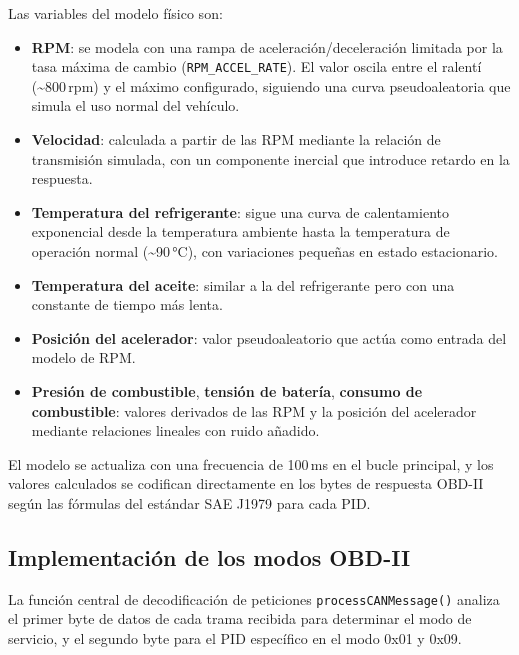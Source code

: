Las variables del modelo físico son:

\begin{itemize}
    \item \textbf{RPM}: se modela con una rampa de aceleración/deceleración limitada por la tasa máxima de cambio (\texttt{RPM\_ACCEL\_RATE}). El valor oscila entre el ralentí (\textasciitilde{}800\,rpm) y el máximo configurado, siguiendo una curva pseudoaleatoria que simula el uso normal del vehículo.

    \item \textbf{Velocidad}: calculada a partir de las RPM mediante la relación de transmisión simulada, con un componente inercial que introduce retardo en la respuesta.

    \item \textbf{Temperatura del refrigerante}: sigue una curva de calentamiento exponencial desde la temperatura ambiente hasta la temperatura de operación normal (\textasciitilde{}90\,°C), con variaciones pequeñas en estado estacionario.

    \item \textbf{Temperatura del aceite}: similar a la del refrigerante pero con una constante de tiempo más lenta.

    \item \textbf{Posición del acelerador}: valor pseudoaleatorio que actúa como entrada del modelo de RPM.

    \item \textbf{Presión de combustible}, \textbf{tensión de batería}, \textbf{consumo de combustible}: valores derivados de las RPM y la posición del acelerador mediante relaciones lineales con ruido añadido.
\end{itemize}

El modelo se actualiza con una frecuencia de 100\,ms en el bucle principal, y los valores calculados se codifican directamente en los bytes de respuesta OBD-II según las fórmulas del estándar SAE J1979 para cada PID.


\subsection{Implementación de los modos OBD-II}

La función central de decodificación de peticiones \texttt{processCANMessage()} analiza el primer byte de datos de cada trama recibida para determinar el modo de servicio, y el segundo byte para el PID específico en el modo 0x01 y 0x09.

